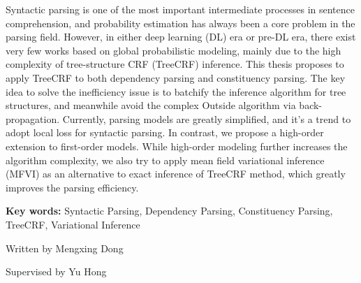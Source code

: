 
\begin{eabstract}
	Syntactic parsing is one of the most important intermediate processes in sentence comprehension,
	and probability estimation has always been a core problem in the parsing field.
	However, in either deep learning (DL) era or pre-DL era, there exist very few works based on global probabilistic modeling, mainly due to the high complexity of tree-structure CRF (TreeCRF) inference.
	This thesis proposes to apply TreeCRF to both dependency parsing and constituency parsing.
	The key idea to solve the inefficiency issue is to batchify the inference algorithm for tree structures, and meanwhile avoid the complex Outside algorithm via back-propagation.
	Currently, parsing models are greatly simplified, and it's a trend to adopt local loss for syntactic parsing.
	In contrast, we propose a high-order extension to first-order models.
	While high-order modeling further increases the algorithm complexity, we also try to apply mean field variational inference (MFVI) as an alternative to exact inference of TreeCRF method, which greatly improves the parsing efficiency.

	\vskip 21bp
	{\bf{} Key words: }
	Syntactic Parsing,
	Dependency Parsing,
	Constituency Parsing,
	TreeCRF,
	Variational Inference
\end{eabstract}

\begin{flushright}
	Written by Mengxing Dong
	
	Supervised by Yu Hong
\end{flushright}
